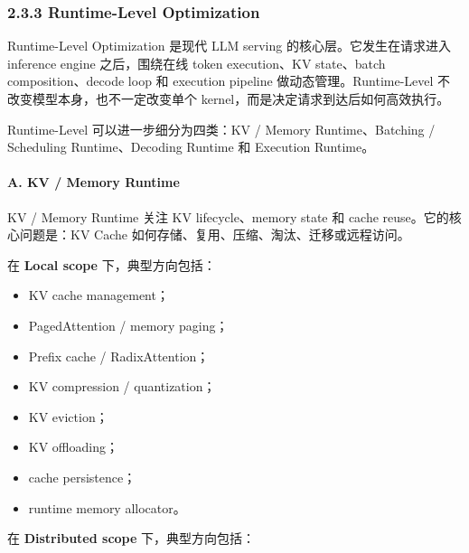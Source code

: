 \documentclass[a4paper,twocolumn,10pt]{ctexart}
\begin{document}
\subsubsection{2.3.3 Runtime-Level Optimization}

Runtime-Level Optimization 是现代 LLM serving 的核心层。它发生在请求进入 inference engine 之后，围绕在线 token execution、KV state、batch composition、decode loop 和 execution pipeline 做动态管理。Runtime-Level 不改变模型本身，也不一定改变单个 kernel，而是决定请求到达后如何高效执行。


Runtime-Level 可以进一步细分为四类：KV / Memory Runtime、Batching / Scheduling Runtime、Decoding Runtime 和 Execution Runtime。


\paragraph*{A. KV / Memory Runtime}

KV / Memory Runtime 关注 KV lifecycle、memory state 和 cache reuse。它的核心问题是：KV Cache 如何存储、复用、压缩、淘汰、迁移或远程访问。


在 \textbf{Local scope} 下，典型方向包括：


\begin{itemize}
\item KV cache management；

\item PagedAttention / memory paging；

\item Prefix cache / RadixAttention；

\item KV compression / quantization；

\item KV eviction；

\item KV offloading；

\item cache persistence；

\item runtime memory allocator。

\end{itemize}
在 \textbf{Distributed scope} 下，典型方向包括：
\end{document}
